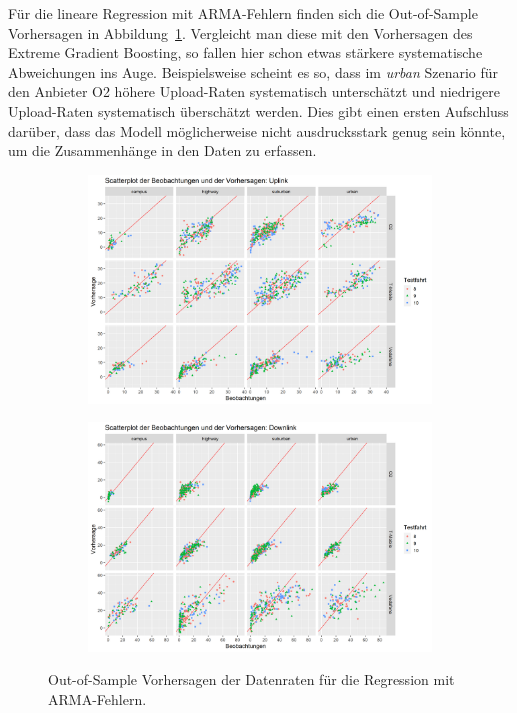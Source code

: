 F\"ur die lineare Regression mit ARMA-Fehlern finden sich die Out-of-Sample Vorhersagen in Abbildung~\ref{fig:datarate-predictions-arma}.
Vergleicht man diese mit den Vorhersagen des Extreme Gradient Boosting, so fallen hier schon etwas st\"arkere systematische
Abweichungen ins Auge.
Beispielsweise scheint es so, dass im \textit{urban} Szenario f\"ur den Anbieter O2 h\"ohere Upload-Raten systematisch untersch\"atzt
und niedrigere Upload-Raten systematisch \"ubersch\"atzt werden.
Dies gibt einen ersten Aufschluss dar\"uber, dass das Modell m\"oglicherweise nicht ausdrucksstark genug sein k\"onnte,
um die Zusammenh\"ange in den Daten zu erfassen.
\begin{figure}
\centering
\begin{subfigure}{\textwidth}
    \centering
    \includegraphics[width=\textwidth]{abbildungen/arma_predictions_ul}
\end{subfigure}
\begin{subfigure}{\textwidth}
    \centering
    \includegraphics[width=\textwidth]{abbildungen/arma_predictions_dl}
\end{subfigure}
\caption{Out-of-Sample Vorhersagen der Datenraten f\"ur die Regression mit ARMA-Fehlern.}
\label{fig:datarate-predictions-arma}
\end{figure}

